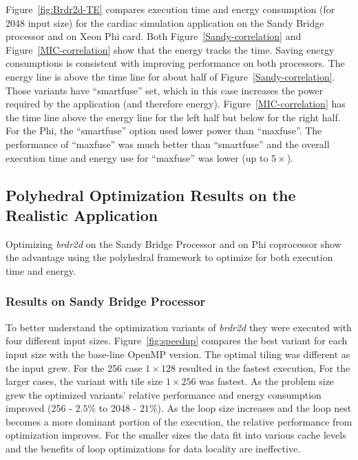 Figure~\ref{fig:Brdr2d-TE} compares execution time and energy consumption  (for 2048 input size) for
the cardiac simulation application on the Sandy Bridge processor and on Xeon Phi card.
Both Figure~\ref{Sandy-correlation} and Figure~\ref{MIC-correlation} show that the
energy tracks the time. Saving energy consumptions is consistent with 
improving performance on both processors.
The energy line is above the time line for about half of Figure~\ref{Sandy-correlation}.
Those variants have ``smartfuse'' set, which in this case increases the power
required by the application (and therefore energy).
Figure~\ref{MIC-correlation} has the time line above
the energy line for the left half but below for the right half. 
For the Phi, the ``smartfuse'' option used lower power than ``maxfuse''.
The performance of ``maxfuse'' was much better than ``smartfuse''
and the overall execution time and energy use for ``maxfuse'' was lower (up to $5\times$).

\subsection{Polyhedral Optimization Results on the Realistic Application}
Optimizing \emph{brdr2d} on the Sandy Bridge Processor and on Phi coprocessor show the
advantage using the polyhedral framework to optimize for
both execution time and energy.

\subsubsection{Results on Sandy Bridge Processor}

To better understand the optimization variants of \emph {brdr2d}
they were executed with four different input sizes. Figure~\ref{fig:speedup}
compares the best variant for each input size
with the base-line OpenMP version. The optimal tiling was different as the
input grew. For the 256 case $1\times128$ resulted in the fastest
execution, For the larger cases, the variant with tile size $1\times256$ was 
fastest. As the problem size grew the optimized variants' relative performance and
energy consumption improved (256 - $2.5\%$ to 2048 - $21\%$). As the loop size
increases and the loop nest becomes a more dominant portion of the execution,
the relative performance from optimization improves.
For the smaller sizes the data fit into various cache levels and the 
benefits of loop optimizations for data locality are ineffective.

